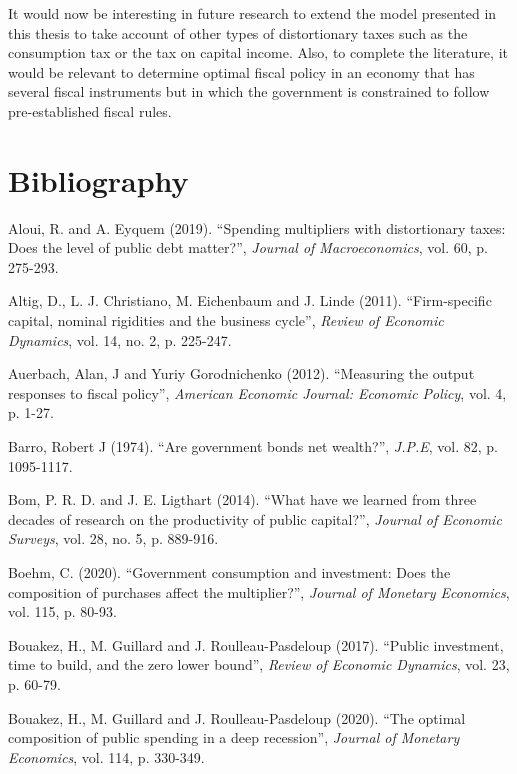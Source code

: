 \documentclass[12pt,letterpaper]{article}
\begin{document}
It would now be interesting in future research to extend the model presented in this thesis to take account of other types of distortionary taxes such as the consumption tax or the tax on capital income. Also, to complete the literature, it would be relevant to determine optimal fiscal policy in an economy that has several fiscal instruments but in which the government is constrained to follow pre-established fiscal rules.

\newpage
\section*{Bibliography}
\begin{list}{}{\setlength{\leftmargin}{2em}\setlength{\itemindent}{-2em}\setlength{\itemsep}{0.3em}}
\small
\item Aloui, R. and A. Eyquem (2019). ``Spending multipliers with distortionary taxes: Does the level of public debt matter?'', \emph{Journal of Macroeconomics}, vol. 60, p. 275-293.
\item Altig, D., L. J. Christiano, M. Eichenbaum and J. Linde (2011). ``Firm-specific capital, nominal rigidities and the business cycle'', \emph{Review of Economic Dynamics}, vol. 14, no. 2, p. 225-247.
\item Auerbach, Alan, J and Yuriy Gorodnichenko (2012). ``Measuring the output responses to fiscal policy'', \emph{American Economic Journal: Economic Policy}, vol. 4, p. 1-27.
\item Barro, Robert J (1974). ``Are government bonds net wealth?'', \emph{J.P.E}, vol. 82, p. 1095-1117.
\item Bom, P. R. D. and J. E. Ligthart (2014). ``What have we learned from three decades of research on the productivity of public capital?'', \emph{Journal of Economic Surveys}, vol. 28, no. 5, p. 889-916.
\item Boehm, C. (2020). ``Government consumption and investment: Does the composition of purchases affect the multiplier?'', \emph{Journal of Monetary Economics}, vol. 115, p. 80-93.
\item Bouakez, H., M. Guillard and J. Roulleau-Pasdeloup (2017). ``Public investment, time to build, and the zero lower bound'', \emph{Review of Economic Dynamics}, vol. 23, p. 60-79.
\item Bouakez, H., M. Guillard and J. Roulleau-Pasdeloup (2020). ``The optimal composition of public spending in a deep recession'', \emph{Journal of Monetary Economics}, vol. 114, p. 330-349.

\end{list}
\end{document}
